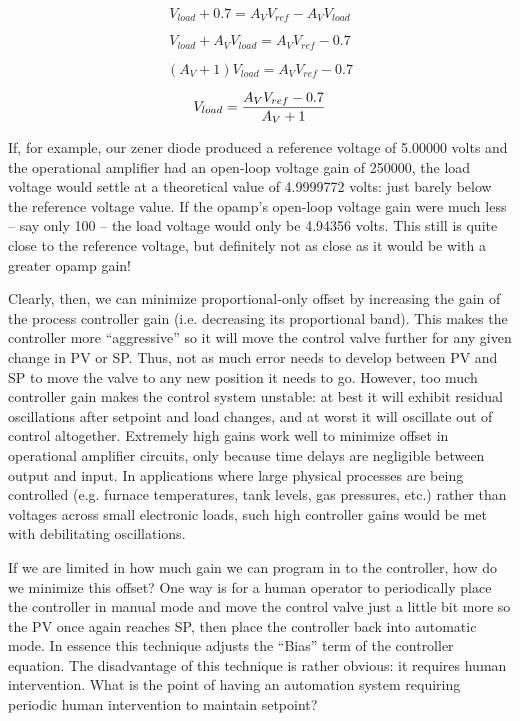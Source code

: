 $$V_{load} + 0.7 = A_V V_{ref} - A_V V_{load}$$

$$V_{load} + A_V V_{load} = A_V V_{ref} - 0.7$$

$$(A_V + 1) V_{load} = A_V V_{ref} - 0.7$$

$$V_{load} = {{A_V V_{ref} - 0.7} \over {A_V + 1}}$$

If, for example, our zener diode produced a reference voltage of 5.00000 volts and the operational amplifier had an open-loop voltage gain of 250000, the load voltage would settle at a theoretical value of 4.9999772 volts: just barely below the reference voltage value.  If the opamp's open-loop voltage gain were much less -- say only 100 -- the load voltage would only be 4.94356 volts.  This still is quite close to the reference voltage, but definitely not as close as it would be with a greater opamp gain!

\vskip 10pt

Clearly, then, we can minimize proportional-only offset by increasing the gain of the process controller gain (i.e. decreasing its proportional band).  This makes the controller more ``aggressive'' so it will move the control valve further for any given change in PV or SP.  Thus, not as much error needs to develop between PV and SP to move the valve to any new position it needs to go.  However, too much controller gain makes the control system unstable: at best it will exhibit residual oscillations after setpoint and load changes, and at worst it will oscillate out of control altogether.  Extremely high gains work well to minimize offset in operational amplifier circuits, only because time delays are negligible between output and input.  In applications where large physical processes are being controlled (e.g. furnace temperatures, tank levels, gas pressures, etc.) rather than voltages across small electronic loads, such high controller gains would be met with debilitating oscillations.

If we are limited in how much gain we can program in to the controller, how do we minimize this offset?  One way is for a human operator to periodically place the controller in manual mode and move the control valve just a little bit more so the PV once again reaches SP, then place the controller back into automatic mode.  In essence this technique adjusts the ``Bias'' term of the controller equation.  The disadvantage of this technique is rather obvious: it requires human intervention.  What is the point of having an automation system requiring periodic human intervention to maintain setpoint?

